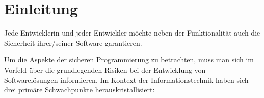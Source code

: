 \section{Einleitung}\label{einleitung}





%
%

Jede Entwicklerin und jeder Entwickler möchte neben der Funktionalität 
auch die Sicherheit ihrer/seiner Software garantieren.

Um die Aspekte der sicheren Programmierung zu betrachten, 
muss man sich im Vorfeld über die grundlegenden Risiken bei der 
Entwicklung von Softwarelösungen informieren.
Im Kontext der Informationstechnik haben sich drei primäre Schwachpunkte
herauskristallisiert:


